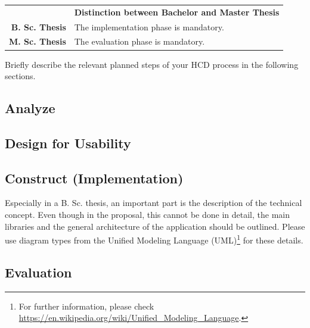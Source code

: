 \begin{table}[htb]
\small
\colorbox{bamacolor}{
\centering
\begin{tabularx}{\textwidth}{@{} r Y @{}}
	&
	\textbf{Distinction between Bachelor and Master Thesis}\vspace{2mm}\\
    \textbf{B. Sc. Thesis} &
    The implementation phase is mandatory. \vspace{2mm}\\
	\textbf{M. Sc. Thesis} &
	The evaluation phase is mandatory. \vspace{2mm}\\

\end{tabularx}
}
\end{table}

Briefly describe the relevant planned steps of your HCD process in the following sections.

\subsection{Analyze}
\label{subsec:analyze}

\subsection{Design for Usability}
\label{subsec:design}

\subsection{Construct (Implementation)}
\label{subsec:implementation}

Especially in a B. Sc. thesis, an important part is the description of the technical concept. Even though in the proposal, this cannot be done in detail, the main libraries and the general architecture of the application should be outlined. Please use diagram types from the Unified Modeling Language (UML)\footnote{For further information, please check \url{https://en.wikipedia.org/wiki/Unified_Modeling_Language}.} for these details.

\subsection{Evaluation}
\label{subsec:evaluation}